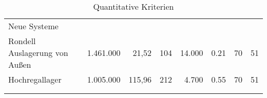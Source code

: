 \begin{longtable}{|p{}|r|r|r|r|r|r|r|}
  Neue Systeme                                                                                                                                                                                                                                                                                                                                                            \\
  Rondell Auslagerung von Außen                      & 1.461.000\cite{ltw_kosten_konstruktionen} & 21,52\cite{ltw_kosten_konstruktionen}     & 104\cite{ltw_kosten_konstruktionen} & 14.000                                      & 0.21                                      & 70\cite{ltw_spielzeiten_20m_rondell}         & 51                                          \\

  Hochregallager                                     & 1.005.000\cite{ltw_kosten_konstruktionen} & 115,96\cite{ltw_kosten_konstruktionen}    & 212\cite{ltw_kosten_konstruktionen} & 4.700                                       & 0.55                                      & 70\cite{ltw_spielzeiten_15m}                 & 51                                          \\

  \multicolumn{2}{c}{}                                                                                                                                                                                                                                                                                                                                                    \\

  \caption{Quantitative Kriterien}
  \label{tab:quantitative_kriterien}
\end{longtable}
